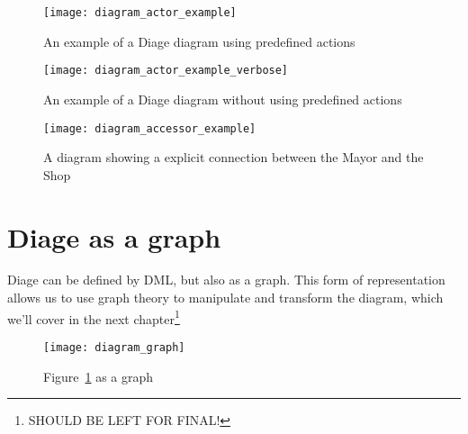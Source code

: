 \begin{figure}[ht]
	\texttt{[image: diagram\_actor\_example]}
	\caption{An example of a Diage diagram using predefined actions}\label{fig:examplediagram}
\end{figure}
\begin{figure}
	\texttt{[image: diagram\_actor\_example\_verbose]}
	\caption{An example of a Diage diagram without using predefined actions}\label{fig:examplediagramverbose}
\end{figure}
\begin{figure}
	\texttt{[image: diagram\_accessor\_example]}
	\caption{A \diage diagram showing a explicit connection between the Mayor and the Shop}
	\label{fig:example:accessors}
\end{figure}
\section{Diage as a graph}
Diage can be defined by DML, but also as a graph. This form of representation allows us to use graph theory to manipulate and transform the diagram, which we'll cover in the next chapter\footnote{SHOULD BE LEFT FOR FINAL!}

\begin{figure}
	\texttt{[image: diagram\_graph]}
	\caption{Figure~\ref{fig:examplediagram} as a graph}\label{fig:example:graph}
\end{figure}